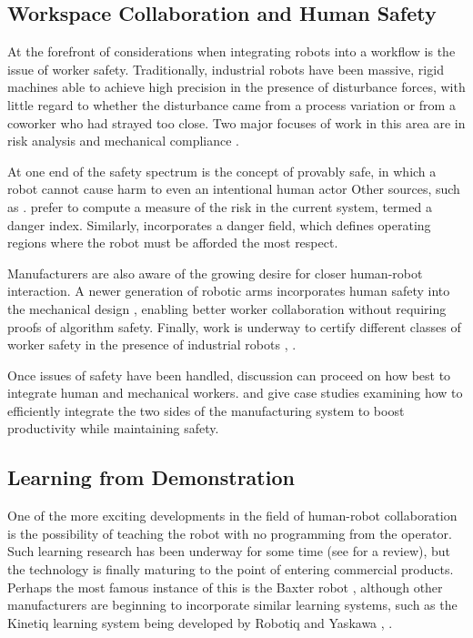 \subsection{Workspace Collaboration and Human Safety}
\label{sec:collaboration}
At the forefront of considerations when integrating robots into a workflow is the issue of worker safety. Traditionally, industrial robots have been massive, rigid machines able to achieve high precision in the presence of disturbance forces, with little regard to whether the disturbance came from a process variation or from a coworker who had strayed too close. Two major focuses of work in this area are in risk analysis and mechanical compliance .

At one end of the safety spectrum is the concept of provably safe, in which a robot cannot cause harm to even an intentional human actor
\cite{Mitsch2013} %
Other sources, such as
\cite{Kulic2006}. %
prefer to compute a measure of the risk in the current system, termed a danger index. Similarly,
\cite{Lacevic2013} %
incorporates a danger field, which defines operating regions where the robot must be afforded the most respect.

Manufacturers are also aware of the growing desire for closer human-robot interaction. A newer generation of robotic arms incorporates human safety into the mechanical design
\cite{UniversalRobots}, %
enabling better worker collaboration
\cite{Knight2013} %
without requiring proofs of algorithm safety.
Finally, work is underway to certify different classes of worker safety in the presence of industrial robots
\cite{Matthias2011}, \cite{Fryman2012}.

Once issues of safety have been handled, discussion can proceed on how best to integrate human and mechanical workers.
\cite{Kruger2009} %
and
\cite{Tan2009}
give case studies examining how to efficiently integrate the two sides of the manufacturing system to boost productivity while maintaining safety.

\subsection{Learning from Demonstration}
One of the more exciting developments in the field of human-robot collaboration is the possibility of teaching the robot with no programming from the operator. Such learning research has been underway for some time (see
\cite{Argall2009}
for a review), but the technology is finally maturing to the point of entering commercial products. Perhaps the most famous instance of this is the Baxter robot
\cite{Fitzgerald2013},
although other manufacturers are beginning to incorporate similar learning systems, such as the Kinetiq learning system being developed by Robotiq and Yaskawa
\cite{Kinetiq2013},
\cite{Kinetiq2013b-url}.


